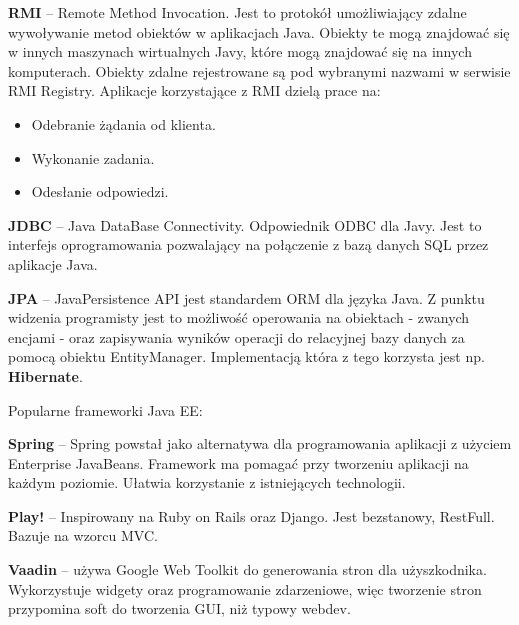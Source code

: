 \textbf{RMI} -- Remote Method Invocation. Jest to protokół umożliwiający zdalne wywoływanie metod obiektów w aplikacjach Java. Obiekty te mogą znajdować się w innych maszynach wirtualnych Javy, które mogą znajdować się na innych komputerach. Obiekty zdalne rejestrowane są pod wybranymi nazwami w serwisie RMI Registry. Aplikacje korzystające z RMI dzielą prace na:
\begin{itemize}
    \item Odebranie żądania od klienta.
    \item Wykonanie zadania.
    \item Odesłanie odpowiedzi.
\end{itemize}

\textbf{JDBC} --  Java DataBase Connectivity. Odpowiednik ODBC dla Javy. Jest to interfejs oprogramowania pozwalający na połączenie z bazą danych SQL przez aplikacje Java.

\textbf{JPA} -- JavaPersistence API jest standardem ORM dla języka Java. Z punktu widzenia programisty jest to możliwość operowania na obiektach - zwanych encjami - oraz zapisywania wyników operacji do relacyjnej bazy danych za pomocą obiektu EntityManager. Implementacją która z tego korzysta jest np. \textbf{Hibernate}.

Popularne frameworki Java EE:

\textbf{Spring} -- Spring powstał jako alternatywa dla programowania aplikacji z użyciem Enterprise JavaBeans. Framework ma pomagać przy tworzeniu aplikacji na każdym poziomie. Ułatwia korzystanie z istniejących technologii.

\textbf{Play!} -- Inspirowany na Ruby on Rails oraz Django. Jest bezstanowy, RestFull. Bazuje na wzorcu MVC.

\textbf{Vaadin} -- używa Google Web Toolkit do generowania stron dla użyszkodnika. Wykorzystuje widgety oraz programowanie zdarzeniowe, więc tworzenie stron przypomina soft do tworzenia GUI, niż typowy webdev.